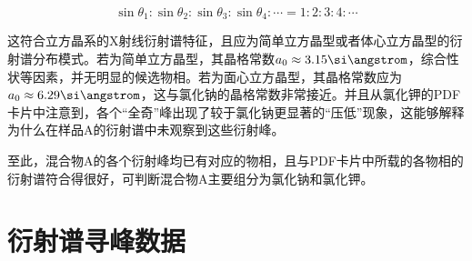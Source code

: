 \documentclass{thuemp}
\begin{document}
\begin{equation}
    \sin{\theta_1} : \sin{\theta_2} :\sin{\theta_3} : \sin{\theta_4} : \cdots = 1 : 2 : 3 : 4 : \cdots
    \label{eq:mixture_a_diff_patt}
\end{equation}

这符合立方晶系的X射线衍射谱特征，且应为简单立方晶型或者体心立方晶型的衍射谱分布模式。若为简单立方晶型，其晶格常数$a_0 \approx 3.15 \text{\si\angstrom}$，综合性状等因素，并无明显的候选物相。若为面心立方晶型，其晶格常数应为$a_0 \approx 6.29 \text{\si\angstrom}$，这与氯化钠的晶格常数非常接近。并且从氯化钾的PDF卡片中注意到，各个“全奇”峰出现了较于氯化钠更显著的“压低”现象，这能够解释为什么在样品A的衍射谱中未观察到这些衍射峰。

至此，混合物A的各个衍射峰均已有对应的物相，且与PDF卡片中所载的各物相的衍射谱符合得很好，可判断混合物A主要组分为氯化钠和氯化钾。




\renewcommand\refname{\heiti\wuhao\centerline{参考文献}\global\def\refname{参考文献}}
\vskip 12pt


\let\OLDthebibliography\thebibliography
\renewcommand\thebibliography[1]{
  \OLDthebibliography{#1}
  \setlength{\parskip}{0pt}
  \setlength{\itemsep}{0pt plus 0.3ex}
}

{
\renewcommand{\baselinestretch}{0.9}
\liuhao


}

\appendix
\section{衍射谱寻峰数据}
\end{document}
